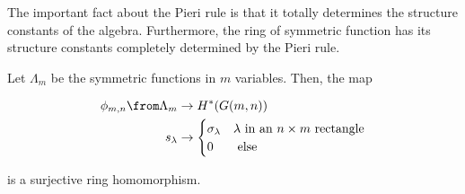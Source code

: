 \documentclass[11pt,leqno,oneside]{amsart}
\numberwithin{thm}{section}
\newcommand{\sym}{\Lambda}
\begin{document}
The important fact about the Pieri rule is that it totally determines
the structure constants of the algebra. Furthermore, the ring of
symmetric function has its structure constants completely determined
by the Pieri rule.
\begin{cor}
  Let \(\sym_m\) be the symmetric functions in \(m\) variables. Then,
  the map \\
  \begin{minipage}{1.0\linewidth}
    \begin{align*}
      \phi_{m,n} \from \sym_m & \to H^*(G(m,n))\\
      s_\lambda & \to
                  \begin{cases}
                    \sigma_\lambda & \lambda \text{ in an }n \times
                    m\text{ rectangle}\\
                    0 & \text{ else}
                  \end{cases}
    \end{align*}
  \end{minipage}
  is a surjective ring homomorphism.
\end{cor}
\begin{bibdiv}
  \begin{biblist}
  \end{biblist}
\end{bibdiv}
\end{document}
